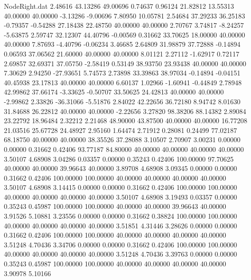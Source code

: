 \begin{filecontents}{NodeRight.dat}
   2.48616   43.13286   49.00696     0.74637    0.96124   21.82812   13.55313   40.00000   40.00000   -3.13286   -9.00696    7.80950   10.05781
   2.54684   37.29233   36.25183    -0.79357   -0.54288   27.18438   22.48750   40.00000   40.00000    2.70767    3.74817   -8.24257   -5.63875
   2.59747   32.12307   44.40796    -0.00569    0.31662   33.70625   18.00000   40.00000   40.00000    7.87693   -4.40796   -0.06234    3.46685
   2.64809   31.98879   37.72888    -0.14894    0.06593   37.06562   21.60000   40.00000   40.00000    8.01121    2.27112   -1.62917    0.72117
   2.69857   32.69371   37.05750    -2.58419    0.53149   38.93750   23.93438   40.00000   40.00000    7.30629    2.94250  -27.93651    5.74573
   2.73898   33.39863   38.97034    -0.14894   -0.04151   40.45938   23.17813   40.00000   40.00000    6.60137    1.02966   -1.60941   -0.44849
   2.78948   42.99862   37.66174    -3.33625   -0.50707   33.50625   24.42813   40.00000   40.00000   -2.99862    2.33826  -36.31066   -5.51876
   2.84022   42.22656   36.72180     8.94742    8.01630   31.84688   26.22812   40.00000   40.00000   -2.22656    3.27820   98.38206   88.14382
   2.89084   23.22792   18.96484     2.32212    2.21468   48.90000   43.87500   40.00000   40.00000   16.77208   21.03516   25.67728   24.48927
   2.95160    1.64474    2.71912     0.28081    0.24499   77.02187   68.18750   40.00000   40.00000   38.35526   37.28088    3.10507    2.70907
   3.00231    0.00000    0.00000     0.31662    0.42406   93.77187   84.80000   40.00000   40.00000   40.00000   40.00000    3.50107    4.68908
   3.04286    0.03357    0.00000     0.35243    0.42406  100.00000   97.70625   40.00000   40.00000   39.96643   40.00000    3.89708    4.68908
   3.09345    0.00000    0.00000     0.31662    0.42406  100.00000  100.00000   40.00000   40.00000   40.00000   40.00000    3.50107    4.68908
   3.14415    0.00000    0.00000     0.31662    0.42406  100.00000  100.00000   40.00000   40.00000   40.00000   40.00000    3.50107    4.68908
   3.19493    0.03357    0.00000     0.35243    0.45987  100.00000  100.00000   40.00000   40.00000   39.96643   40.00000    3.91526    5.10881
   3.23556    0.00000    0.00000     0.31662    0.38824  100.00000  100.00000   40.00000   40.00000   40.00000   40.00000    3.51851    4.31446
   3.28626    0.00000    0.00000     0.31662    0.42406  100.00000  100.00000   40.00000   40.00000   40.00000   40.00000    3.51248    4.70436
   3.34706    0.00000    0.00000     0.31662    0.42406  100.00000  100.00000   40.00000   40.00000   40.00000   40.00000    3.51248    4.70436
   3.39763    0.00000    0.00000     0.35243    0.45987  100.00000  100.00000   40.00000   40.00000   40.00000   40.00000    3.90978    5.10166

\end{filecontents}
